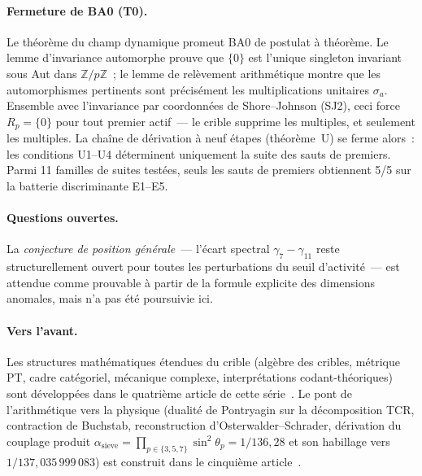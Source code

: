 \documentclass[12pt,a4paper]{article}
\begin{document}
\paragraph{Fermeture de BA0 (T0).}
Le théorème du champ dynamique promeut BA0 de postulat à théorème.
Le lemme d'invariance automorphe prouve que $\{0\}$ est l'unique
singleton invariant sous Aut dans $\mathbb{Z}/p\mathbb{Z}$~; le
lemme de relèvement arithmétique montre que les automorphismes
pertinents sont précisément les multiplications unitaires
$\sigma_a$. Ensemble avec l'invariance par coordonnées de
Shore--Johnson (SJ2), ceci force $R_p = \{0\}$ pour tout premier
actif~--- le crible supprime les multiples, et seulement les
multiples. La chaîne de dérivation à neuf étapes (théorème~U) se
ferme alors~: les conditions U1--U4 déterminent uniquement la suite
des sauts de premiers. Parmi 11 familles de suites testées, seuls
les sauts de premiers obtiennent 5/5 sur la batterie discriminante
E1--E5.

\paragraph{Questions ouvertes.}
La \emph{conjecture de position générale}~--- l'écart spectral
$\gamma_7 - \gamma_{11}$ reste structurellement ouvert pour toutes
les perturbations du seuil d'activité~--- est attendue comme
prouvable à partir de la formule explicite des dimensions anomales,
mais n'a pas été poursuivie ici.

\paragraph{Vers l'avant.}
Les structures mathématiques étendues du crible (algèbre des
cribles, métrique PT, cadre catégoriel, mécanique complexe,
interprétations codant-théoriques) sont développées dans le quatrième
article de cette série~\cite{companion_M4}. Le pont de l'arithmétique
vers la physique (dualité de Pontryagin sur la décomposition TCR,
contraction de Buchstab, reconstruction d'Osterwalder--Schrader,
dérivation du couplage produit
$\alpha_{\mathrm{sieve}} = \prod_{p \in \{3,5,7\}} \sin^2\!\theta_p
= 1/136{,}28$ et son habillage vers $1/137{,}035\,999\,083$) est
construit dans le cinquième article~\cite{companion_M5}.



\end{document}
